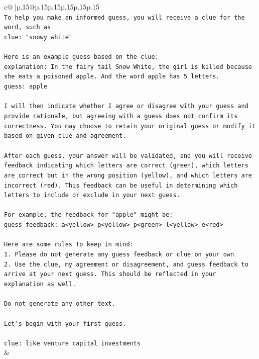 \documentclass{article}
\begin{document}
{\begin{supertabular}{c@{$\;$}|p{.15\linewidth}@{}p{.15\linewidth}p{.15\linewidth}p{.15\linewidth}p{.15\linewidth}p{.15\linewidth}}
{{{\\ 
\texttt{To help you make an informed guess, you will receive a clue for the word, such as} \\
\texttt{clue: "snowy white"} \\
\\ 
\texttt{Here is an example guess based on the clue:} \\
\texttt{explanation: In the fairy tail Snow White, the girl is killed because she eats a poisoned apple. And the word apple has 5 letters.} \\
\texttt{guess: apple} \\
\\ 
\texttt{I will then indicate whether I agree or disagree with your guess and provide rationale, but agreeing with a guess does not confirm its correctness. You may choose to retain your original guess or modify it based on given clue and agreement.} \\
\\ 
\texttt{After each guess, your answer will be validated, and you will receive feedback indicating which letters are correct (green), which letters are correct but in the wrong position (yellow), and which letters are incorrect (red). This feedback can be useful in determining which letters to include or exclude in your next guess.} \\
\\ 
\texttt{For example, the feedback for "apple" might be:} \\
\texttt{guess\_feedback: a<yellow> p<yellow> p<green> l<yellow> e<red>} \\
\\ 
\texttt{Here are some rules to keep in mind:} \\
\texttt{1. Please do not generate any guess feedback or clue on your own} \\
\texttt{2. Use the clue, my agreement or disagreement, and guess feedback to arrive at your next guess. This should be reflected in your explanation as well.} \\
\\ 
\texttt{Do not generate any other text.} \\
\\ 
\texttt{Let's begin with your first guess.} \\
\\ 
\texttt{clue: like venture capital investments} \\
            }
        }
    }
    & \\ \\


\end{supertabular}}
\end{document}
